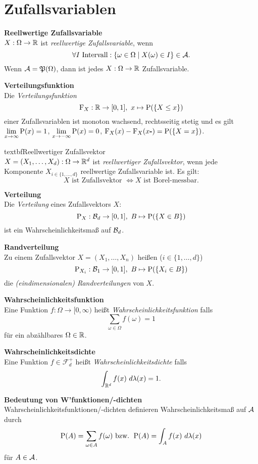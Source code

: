 \section{Zufallsvariablen}
\textbf{Reellwertige Zufallsvariable}\\
$X:\Omega\to\R$ ist \textit{reellwertige Zufallsvariable}, wenn
\[
	\forall I \text{ Intervall}: \{\omega\in\Omega\mid X(\omega)\in I\}\in\A.
\]
Wenn $\A=\mathfrak{P}(\Omega)$, dann ist jedes $X:\Omega\to\R$ Zufallsvariable.

\textbf{Verteilungsfunktion}\\
Die \textit{Verteilungsfunktion}
\[
	\F_X:\R\to[0,1],\ x\mapsto\P(\{X\leq x\})
\]
einer Zufallsvariablen ist monoton wachsend, rechtsseitig stetig und es gilt\\
$\lim\limits_{x\to\infty}\P(x)=1$,
$\lim\limits_{x\to -\infty}\P(x)=0$, 
\mbox{$\F_X(x)-\F_X(x\textbf{-})=\P(\{X=x\})$}.

textbf{Reellwertiger Zufallsvektor}\\
$X=(X_1,\ldots,X_d):\Omega\to\R^d$ ist \textit{reellwertiger Zufallsvektor}, wenn jede
Komponente $X_{i\in\{1,\ldots,d\}}$ reellwertige Zufallsvariable ist. Es gilt:\\
\[
	X \text{ ist Zufallsvektor } \Leftrightarrow X \text{ ist Borel-messbar.}
\]

\textbf{Verteilung}\\
Die \textit{Verteilung} eines Zufallsvektors $X$: 
\[
	\P_X: \B{d}\to [0,1],\ B\mapsto\P(\{X\in B\})
\]
ist ein Wahrscheinlichkeitsmaß auf $\B{d}$.

\textbf{Randverteilung}\\
Zu einem Zufallsvektor $X=(X_1,\ldots,X_n)$ heißen ($i\in\{1,\ldots,d\}$)
\[
	\P_{X_i} :\B{1}\to[0,1],\ B\mapsto \P(\{X_i\in B\})
\]
die \textit{(eindimensionalen) Randverteilungen} von $X$.

\textbf{Wahrscheinlichkeitsfunktion}\\
Eine Funktion $f:\Omega\to[0,\infty)$ heißt \textit{Wahrscheinlichkeitsfunktion} falls
\[
	  \sum_{\omega\in\Omega} f(\omega)=1
\]
für ein abzählbares $\Omega\in\R$.

\textbf{Wahrscheinlichkeitsdichte}\\
Eine Funktion $f\in\mathcal{F}_d^+$ heißt \textit{Wahrscheinlichkeitsdichte} falls
\[
	 \int_{\R^d} f(x)~d\lambda(x)=1.
\]

\textbf{Bedeutung von W'funktionen/-dichten}\\
Wahrscheinlichkeitsfunktionen/-dichten definieren Wahrscheinlichkeitsmaß auf $\A$
durch 
\[
\P(A)=\sum_{\omega\in A}f(\omega) \text{ bzw. } \P(A)=\int_A f(x)~d\lambda(x)
\]
für $A\in\A$.

